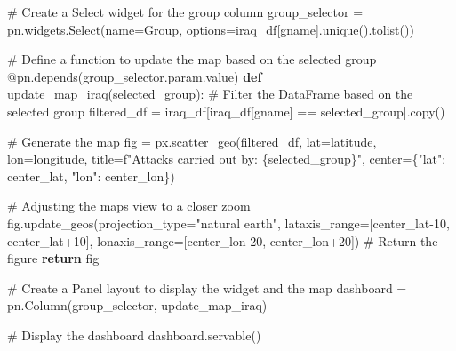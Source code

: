 \documentclass[
  letterpaper,
  DIV=11,
  numbers=noendperiod]{scrreprt}
\newenvironment{Shaded}{\begin{snugshade}}{\end{snugshade}}
\newcommand{\AttributeTok}[1]{\textcolor[rgb]{0.40,0.45,0.13}{#1}}
\newcommand{\CommentTok}[1]{\textcolor[rgb]{0.37,0.37,0.37}{#1}}
\newcommand{\ControlFlowTok}[1]{\textcolor[rgb]{0.00,0.23,0.31}{\textbf{#1}}}
\newcommand{\DecValTok}[1]{\textcolor[rgb]{0.68,0.00,0.00}{#1}}
\newcommand{\KeywordTok}[1]{\textcolor[rgb]{0.00,0.23,0.31}{\textbf{#1}}}
\newcommand{\NormalTok}[1]{\textcolor[rgb]{0.00,0.23,0.31}{#1}}
\newcommand{\OperatorTok}[1]{\textcolor[rgb]{0.37,0.37,0.37}{#1}}
\newcommand{\SpecialCharTok}[1]{\textcolor[rgb]{0.37,0.37,0.37}{#1}}
\newcommand{\SpecialStringTok}[1]{\textcolor[rgb]{0.13,0.47,0.30}{#1}}
\newcommand{\StringTok}[1]{\textcolor[rgb]{0.13,0.47,0.30}{#1}}
\begin{document}
\begin{Shaded}
\begin{Highlighting}[]
\CommentTok{\# Create a Select widget for the \textquotesingle{}group\textquotesingle{} column}
\NormalTok{group\_selector }\OperatorTok{=}\NormalTok{ pn.widgets.Select(name}\OperatorTok{=}\StringTok{\textquotesingle{}Group\textquotesingle{}}\NormalTok{, options}\OperatorTok{=}\NormalTok{iraq\_df[}\StringTok{\textquotesingle{}gname\textquotesingle{}}\NormalTok{].unique().tolist())}

\CommentTok{\# Define a function to update the map based on the selected group}
\AttributeTok{@pn.depends}\NormalTok{(group\_selector.param.value)}
\KeywordTok{def}\NormalTok{ update\_map\_iraq(selected\_group):}
    \CommentTok{\# Filter the DataFrame based on the selected group}
\NormalTok{    filtered\_df }\OperatorTok{=}\NormalTok{ iraq\_df[iraq\_df[}\StringTok{\textquotesingle{}gname\textquotesingle{}}\NormalTok{] }\OperatorTok{==}\NormalTok{ selected\_group].copy()}
    
    \CommentTok{\# Generate the map}
\NormalTok{    fig }\OperatorTok{=}\NormalTok{ px.scatter\_geo(filtered\_df, lat}\OperatorTok{=}\StringTok{\textquotesingle{}latitude\textquotesingle{}}\NormalTok{, lon}\OperatorTok{=}\StringTok{\textquotesingle{}longitude\textquotesingle{}}\NormalTok{, title}\OperatorTok{=}\SpecialStringTok{f"Attacks carried out by: }\SpecialCharTok{\{}\NormalTok{selected\_group}\SpecialCharTok{\}}\SpecialStringTok{"}\NormalTok{,}
\NormalTok{                        center}\OperatorTok{=}\NormalTok{\{}\StringTok{"lat"}\NormalTok{: center\_lat, }\StringTok{"lon"}\NormalTok{: center\_lon\})}

    \CommentTok{\# Adjusting the map\textquotesingle{}s view to a \textquotesingle{}closer\textquotesingle{} zoom}
\NormalTok{    fig.update\_geos(projection\_type}\OperatorTok{=}\StringTok{"natural earth"}\NormalTok{, lataxis\_range}\OperatorTok{=}\NormalTok{[center\_lat}\OperatorTok{{-}}\DecValTok{10}\NormalTok{, center\_lat}\OperatorTok{+}\DecValTok{10}\NormalTok{], lonaxis\_range}\OperatorTok{=}\NormalTok{[center\_lon}\OperatorTok{{-}}\DecValTok{20}\NormalTok{, center\_lon}\OperatorTok{+}\DecValTok{20}\NormalTok{])}
    \CommentTok{\# Return the figure}
    \ControlFlowTok{return}\NormalTok{ fig}

\CommentTok{\# Create a Panel layout to display the widget and the map}
\NormalTok{dashboard }\OperatorTok{=}\NormalTok{ pn.Column(group\_selector, update\_map\_iraq)}

\CommentTok{\# Display the dashboard}
\NormalTok{dashboard.servable()}
\end{Highlighting}
\end{Shaded}
\end{document}
